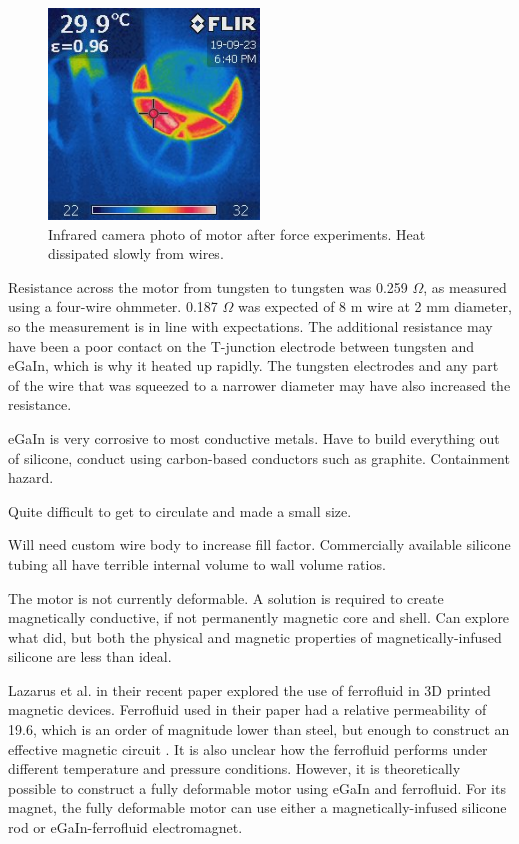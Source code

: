 \documentclass[a4paper,12pt]{article}
\begin{document}
\begin{figure}[h!]
    \centering
    \includegraphics[width=0.5\textwidth]{coilheat.jpg}
    \caption{Infrared camera photo of motor after force experiments. Heat dissipated  slowly from wires.}
    \label{fg:forceplot}
\end{figure}

Resistance across the motor from tungsten to tungsten was 0.259 $\Omega$, as measured using a four-wire ohmmeter. 0.187 $\Omega$ was expected of 8 m wire at 2 mm diameter, so the measurement is in line with expectations. The additional resistance may have been a poor contact on the T-junction electrode between tungsten and eGaIn, which is why it heated up rapidly. The tungsten electrodes and any part of the wire that was squeezed to a narrower diameter may have also increased the resistance.

eGaIn is very corrosive to most conductive metals. Have to build everything out of silicone, conduct using carbon-based conductors such as graphite. Containment hazard.

Quite difficult to get to circulate and made a small size.

Will need custom wire body to increase fill factor. Commercially available silicone tubing all have terrible internal volume to wall volume ratios.

The motor is not currently deformable. A solution is required to create magnetically conductive, if not permanently magnetic core and shell. Can explore what \cite{doMiniatureSoftElectromagnetic2018} did, but both the physical and magnetic properties of magnetically-infused silicone are less than ideal.

Lazarus et al. in their recent paper \cite{lazarusCreating3DPrinted2019} explored the use of ferrofluid in 3D printed magnetic devices. Ferrofluid used in their paper had a relative permeability of 19.6, which is an order of magnitude lower than steel, but enough to construct an effective magnetic circuit \cite{ferrotecFerrotecFerrofluidInnovating}. It is also unclear how the ferrofluid performs under different temperature and pressure conditions. However, it is theoretically possible to construct a fully deformable motor using eGaIn and ferrofluid. For its magnet, the fully deformable motor can use either a magnetically-infused silicone rod or eGaIn-ferrofluid electromagnet.
\end{document}
